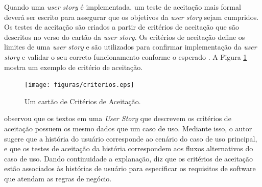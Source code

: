 Quando uma \textit{user story} é implementada, um teste de aceitação mais formal deverá ser escrito para assegurar que os objetivos da \textit{user story} sejam cumpridos. Os testes de aceitação são criados a partir de critérios de aceitação que são descritos no verso do cartão da \textit{user story}. Os critérios de aceitação define os limites de uma \textit{user story} e são utilizados para confirmar implementação da \textit{user story} e validar o seu correto funcionamento conforme o esperado \cite{cohn2004user}. A Figura \ref{criterio} mostra um exemplo de critério de aceitação.

\begin{figure}[ht]
	\centering
		\texttt{[image: figuras/criterios.eps]}
	\caption{Um cartão de Critérios de Aceitação.}
	\label{criterio}
\end{figure}

\cite{grenning2011test} observou que os textos em uma \textit{User Story} que descrevem os critérios de aceitação possuem os mesmo dados que um caso de uso. Mediante isso, o autor sugere que a história do usuário corresponde ao cenário do caso de uso principal, e que os testes de aceitação da história correspondem aos fluxos alternativos do caso de uso. Dando continuidade a explanação, \cite{grenning2011test} diz que os critérios de aceitação estão associados às histórias de usuário para especificar os requisitos de software que atendam as regras de negócio.







